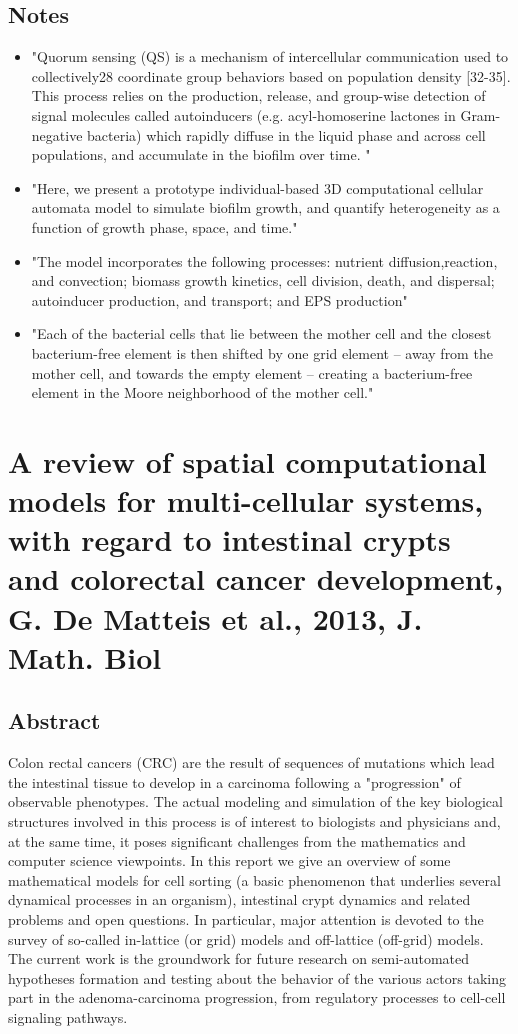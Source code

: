 \documentclass[11pt,a4paper]{article}
\begin{document}
\subsection*{Notes}
\begin{itemize}
\item "Quorum sensing (QS) is a mechanism of intercellular communication used to collectively28
coordinate group behaviors based on population density [32-35]. This process relies on the production, release, and group-wise detection of signal molecules called autoinducers (e.g. acyl-homoserine lactones in Gram-negative bacteria) which rapidly diffuse in the liquid phase and across cell populations, and accumulate in the biofilm over time. "
\item "Here, we present a prototype individual-based 3D computational cellular automata model to simulate biofilm growth, and quantify heterogeneity as a function of growth phase, space, and time."
\item "The model incorporates the following processes: nutrient diffusion,reaction, and convection; biomass growth kinetics, cell division, death, and dispersal; autoinducer production, and transport; and EPS production"
\item "Each of the bacterial cells that lie between the mother cell and the closest bacterium-free element is then shifted by one grid element – away from the mother cell, and towards the empty element – creating a bacterium-free element in the Moore neighborhood of the mother cell."
\end{itemize}

\section*{A review of spatial computational models for multi-cellular systems, with regard to intestinal crypts and colorectal cancer development, G. De Matteis et al., 2013, J. Math. Biol}
\subsection*{Abstract}
Colon rectal cancers (CRC) are the result of sequences of mutations which lead the intestinal tissue to develop in a carcinoma following a "progression" of observable phenotypes. The actual modeling and simulation of the key biological structures involved in this process is of interest to biologists and physicians and, at the same time, it poses significant challenges from the mathematics and computer science viewpoints. In this report we give an overview of some mathematical models for cell sorting (a basic phenomenon that underlies several dynamical processes in an organism), intestinal crypt dynamics and related problems and open questions. In particular, major attention is devoted to the survey of so-called in-lattice (or grid) models and off-lattice (off-grid) models. The current work is the groundwork for future research on semi-automated hypotheses formation and testing about the behavior of the various actors taking part in the adenoma-carcinoma progression, from regulatory processes to cell-cell signaling pathways. 
\end{document}
